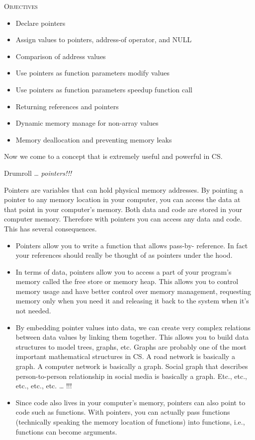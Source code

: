 
\textsc{Objectives}

\begin{itemize}

\item
  Declare pointers
\item
  Assign values to pointers, address-of operator, and NULL
\item
  Comparison of address values
\item
  Use pointers as function parameters modify values
\item
  Use pointers as function parameters speedup function call
\item
  Returning references and pointers
\item
  Dynamic memory manage for non-array values
\item
  Memory deallocation and preventing memory leaks
\end{itemize}

Now we come to a concept that is extremely useful and powerful in CS.

Drumroll \ldots{} \emph{pointers!!!}

Pointers are variables that can hold physical memory addresses. By pointing a pointer to any memory location in your computer, you can access the data at that point in your computer's memory. Both data and code are stored in your computer memory. Therefore with pointers you can access any data and code. This has several consequences.

\begin{itemize}
\item
  Pointers allow you to write a function that allows pass-by- reference.
  In fact your references should really be thought of as pointers under
  the hood.
\item
  In terms of data, pointers allow you to access a part of your
  program's memory called the free store or memory heap. This allows you
  to control memory usage and have better control over memory
  management, requesting memory only when you need it and releasing it
  back to the system when it's not needed.
\item
  By embedding pointer values into data, we can create very complex
  relations between data values by linking them together. This allows
  you to build data structures to model trees, graphs, etc. Graphs are
  probably one of the most important mathematical structures in CS. A
  road network is basically a graph. A computer network is basically a
  graph. Social graph that describes person-to-person relationship in
  social media is basically a graph. Etc., etc., etc., etc., etc.
  \ldots{} !!!
\item
  Since code also lives in your computer's memory, pointers can also
  point to code such as functions. With pointers, you can actually pass
  functions (technically speaking the memory location of functions) into
  functions, i.e., functions can become arguments.
\end{itemize}

